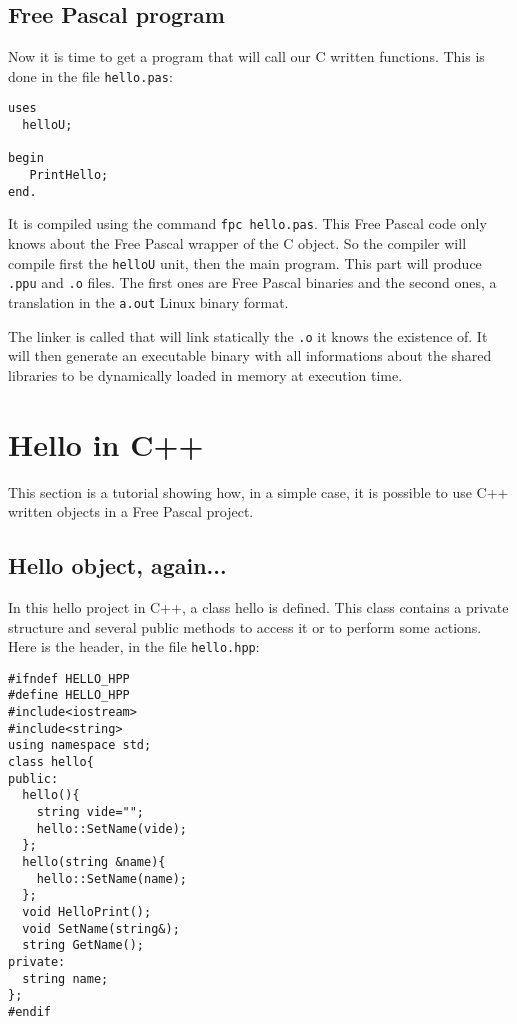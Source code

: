 \documentclass[A4paper]{article}
\begin{document}
\subsection{Free Pascal program}

Now it is time to get a program that will call our C written functions. This
is done in the file \verb|hello.pas|:

\begin{verbatim}
uses
  helloU;

begin
   PrintHello;
end.

\end{verbatim}

It is compiled using the command \verb|fpc hello.pas|. This Free Pascal code
only knows about the Free Pascal wrapper of the C object. So the compiler will
compile first the \verb|helloU| unit, then the main program. This part will
produce \verb|.ppu| and \verb|.o| files. The first ones are Free Pascal
binaries and the second ones, a translation in the \verb|a.out| Linux binary
format.

The linker is called that will link statically the \verb|.o| it knows the
existence of. It will then generate an executable binary with all informations
about the shared libraries to be dynamically loaded in memory at execution
time.

\section{Hello in C++}

This section is a tutorial showing how, in a simple case, it is possible to
use C++ written objects in a Free Pascal project.

\subsection{Hello object, again...}

In this hello project in C++, a class hello is defined. This class
contains a private structure and several public methods to access it or to
perform some actions. Here is the header, in the file \verb|hello.hpp|:

\begin{verbatim}
#ifndef HELLO_HPP
#define HELLO_HPP
#include<iostream>
#include<string>
using namespace std;
class hello{
public:
  hello(){
    string vide="";
    hello::SetName(vide);
  };
  hello(string &name){
    hello::SetName(name);
  };
  void HelloPrint();
  void SetName(string&);
  string GetName();
private:
  string name;
};
#endif

\end{verbatim}
\end{document}
